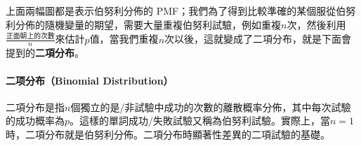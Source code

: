 \documentclass[11pt]{article}
\begin{document}
    上面兩幅圖都是表示伯努利分佈的
PMF；我們為了得到比較準確的某個服從伯努利分佈的隨機變量的期望，需要大量重複伯努利試驗，例如重複\(n\)次，然後利用\(\frac{正面朝上的次數}{n}\)來估計\(p\)值，當我們重複\(n\)次以後，這就變成了二項分布，就是下面會提到的\textbf{二項分布}。

    \hypertarget{ux4e8cux9879ux5206ux5e03binomial-distribution}{%
\paragraph{二项分布（Binomial
Distribution）}\label{ux4e8cux9879ux5206ux5e03binomial-distribution}}

二項分布是指\(n\)個獨立的是/非試驗中成功的次數的離散概率分佈，其中每次試驗的成功概率為\(p\)。這樣的單詞成功/失敗試驗又稱為伯努利試驗。實際上，當\(n = 1\)時，二項分布就是伯努利分佈。二項分布時顯著性差異的二項試驗的基礎。
\end{document}

